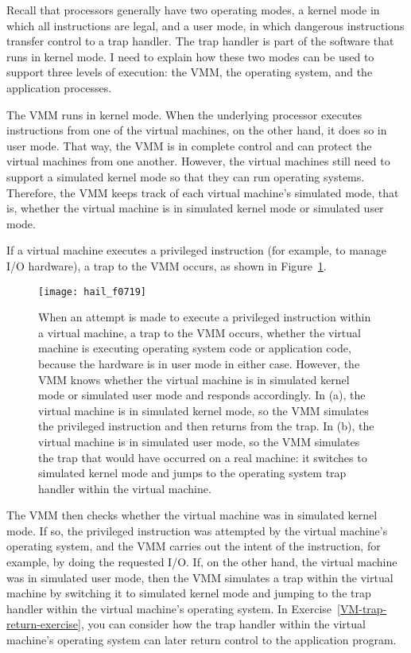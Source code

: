 Recall that processors generally have two operating modes, a kernel
mode in which all instructions are legal, and a user mode, in which
dangerous instructions transfer control to a trap handler.
The trap handler is part of the software that runs in kernel mode.
I need
to explain how these two modes can be used to support three levels of
execution: the VMM, the operating system, and the application
processes.

The VMM runs in kernel mode.  When the underlying processor
executes instructions from one of the virtual machines, on the other
hand, it does so in user mode.  That way, the VMM is in complete
control and can protect the virtual machines from one another.
However, the virtual machines still need to support a simulated kernel
mode so that they can run operating systems.  Therefore, the VMM
keeps track of each virtual machine's simulated mode, that is, whether
the virtual machine is in simulated kernel mode or simulated user
mode.

If a virtual machine executes a privileged instruction (for example,
to manage I/O hardware), a trap to the VMM occurs, as shown in
Figure~\ref{VMM-modes}.
\begin{figure}
\centerline{\texttt{[image: hail\_f0719]}}
\caption{When an attempt is made to
  execute a privileged instruction within a virtual machine, a trap to the VMM occurs, whether
  the virtual machine is executing operating system code or
  application code, because the hardware is in user mode in either case.  However, the VMM
  knows whether the virtual machine is in simulated kernel mode or
  simulated user mode and responds accordingly.  In (a), the
  virtual machine is in simulated kernel mode, so the VMM simulates
  the privileged instruction and then returns from the trap. 
  In (b), the virtual machine is in simulated user mode, so the VMM
  simulates the trap that would have occurred on a real machine: it
  switches to simulated kernel mode and jumps to the operating system
  trap handler within the virtual machine.}
\label{VMM-modes}
\end{figure}
The VMM then
checks whether the virtual machine was in simulated kernel mode.  If
so, the privileged instruction was attempted by the virtual machine's
operating system, and the VMM carries out the intent of the
instruction, for example, by doing the requested I/O.  If, on the
other hand, the virtual machine was in simulated user mode, then the
VMM simulates a trap within the virtual machine by switching it to
simulated kernel mode and jumping to the trap handler within the
virtual machine's operating system.  In
Exercise~\ref{VM-trap-return-exercise}, you can consider how the trap
handler within the virtual machine's operating system can later return
control to the application program.


